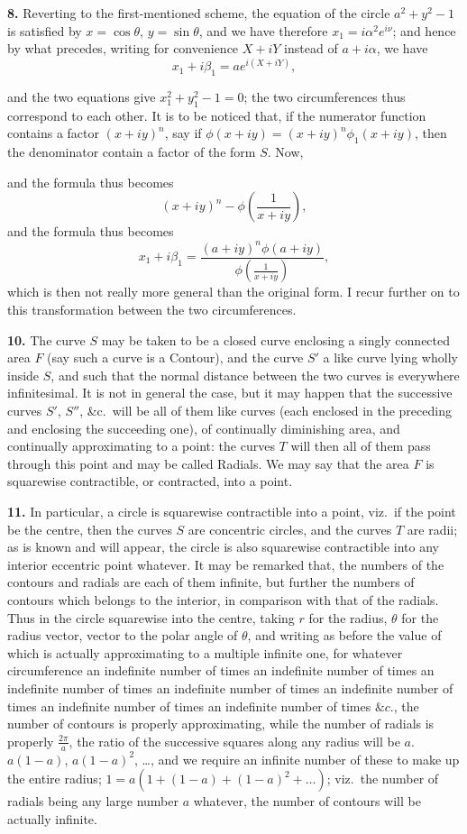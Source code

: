 \documentclass[11pt,a4paper]{book}
\begin{document}
\textbf{8.} Reverting to the first-mentioned scheme, the equation of the circle $a^2 + y^2 - 1$ is satisfied by $x = \cos \theta$, $y = \sin \theta$, and we have therefore $x_1 = i \alpha^2 e^{i \nu}$; and hence by what precedes, writing for convenience $X + i Y$ instead of $a + i \alpha$, we have
\[
x_1 + i\beta_1 = a e^{i (X + i Y)},
\]

and the two equations give $x_1^2 + y_1^2 - 1 = 0$; the two circumferences thus correspond to each other. It is to be noticed that, if the numerator function contains a factor $(x + iy)^n$, say if $\phi(x + iy) = (x + i y)^n \phi_1(x + iy)$, then the denominator contain a factor of the form $S$. Now,

and the formula thus becomes
\[
(x + i y)^n - \phi\left(\frac{1}{x + iy}\right),
\]
and the formula thus becomes
\[
x_1 + i\beta_1 = \frac{(a + i y)^n \phi(a + i y)}{\phi\left(\frac{1}{x + iy}\right)},
\]
which is then not really more general than the original form. I recur further on to this transformation between the two circumferences.

\textbf{10.} The curve $S$ may be taken to be a closed curve enclosing a singly connected area $F$ (say such a curve is a Contour), and the curve $S'$ a like curve lying wholly inside $S$, and such that the normal distance between the two curves is everywhere infinitesimal. It is not in general the case, but it may happen that the successive curves $S'$, $S''$, \&c.\ will be all of them like curves (each enclosed in the preceding and enclosing the succeeding one), of continually diminishing area, and continually approximating to a point: the curves $T$ will then all of them pass through this point and may be called Radials. We may say that the area $F$ is squarewise contractible, or contracted, into a point.

\textbf{11.} In particular, a circle is squarewise contractible into a point, viz.\ if the point be the centre, then the curves $S$ are concentric circles, and the curves $T$ are radii; as is known and will appear, the circle is also squarewise contractible into any interior eccentric point whatever. It may be remarked that, the numbers of the contours and radials are each of them infinite, but further the numbers of contours which belongs to the interior, in comparison with that of the radials. Thus in the circle squarewise into the centre, taking $r$ for the radius, $\theta$ for the radius vector, vector to the polar angle of $\theta$, and writing as before the value of which is actually approximating to a multiple infinite one, for whatever circumference an indefinite number of times an indefinite number of times an indefinite number of times an indefinite number of times an indefinite number of times an indefinite number of times an indefinite number of times $\&c.$, the number of contours is properly approximating, while the number of radials is properly $\frac{2\pi}{a}$, the ratio of the successive squares along any radius will be $a$. $a(1 - a)$, $a(1 - a)^2$, \ldots, and we require an infinite number of these to make up the entire radius; $1 = a (1 + (1 - a) + (1 - a)^2 + \ldots)$; viz.\ the number of radials being any large number $a$ whatever, the number of contours will be actually infinite.
\end{document}

